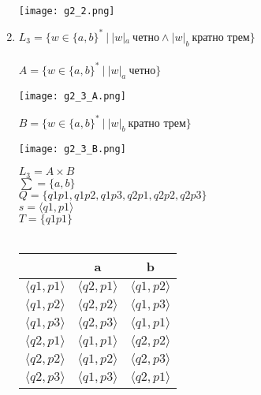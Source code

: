 \documentclass{article}
\begin{document}
\begin{enumerate}
    \\ 
    \begin{flushleft}
        \texttt{[image: g2\_2.png]}
    \end{flushleft}
    \item {$L_3 = \{ w \in \{ a, b\}^* \ | \ |w|_a \ \text{четно} \wedge |w|_b \ \text{кратно трем} \}$} \\ \\
    $A = \{ w \in \{ a, b\}^* \ | \ |w|_a \ \text{четно}\}$
    \begin{flushleft}
        \texttt{[image: g2\_3\_A.png]}
    \end{flushleft}
    $B = \{ w \in \{ a, b\}^* \ | \ |w|_b \ \text{кратно трем} \}$
    \begin{flushleft}
        \texttt{[image: g2\_3\_B.png]}
    \end{flushleft}
    $L_3 = A \times B$ \\
    $\sum = \{a, b\}$ \\
    $Q = \{q1p1, q1p2, q1p3, q2p1, q2p2, q2p3\}$ \\
    $s = \langle q1, p1 \rangle $ \\
    $T = \{q1p1\}$ \\ \\
    \begin{tabular}{|c|c|c|}
        \hline
                              & a                         & b     \\ \hline
         $\langle q1,p1 \rangle$    & $\langle q2,p1 \rangle$   & $\langle q1,p2 \rangle$    \\
         $\langle q1,p2 \rangle$    & $\langle q2,p2 \rangle$   & $\langle q1,p3 \rangle$    \\ 
         $\langle q1,p3 \rangle$    & $\langle q2,p3 \rangle$   & $\langle q1,p1 \rangle$    \\
         $\langle q2,p1 \rangle$    & $\langle q1,p1 \rangle$   & $\langle q2,p2 \rangle$    \\ 
         $\langle q2,p2 \rangle$    & $\langle q1,p2 \rangle$   & $\langle q2,p3 \rangle$    \\
         $\langle q2,p3 \rangle$    & $\langle q1,p3 \rangle$   & $\langle q2,p1 \rangle$    \\  \hline
    \end{tabular} \\
    

\end{enumerate}
\end{document}
